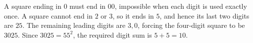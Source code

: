 A square ending in $0$ must end in $00$, impossible when each digit is used exactly once. A square cannot end in $2$ or $3$, so it ends in $5$, and hence its last two digits are $25$. The remaining leading digits are $3,0$, forcing the four-digit square to be $3025$. Since $3025=55^2$, the required digit sum is $5+5=\boxed{10}$.
